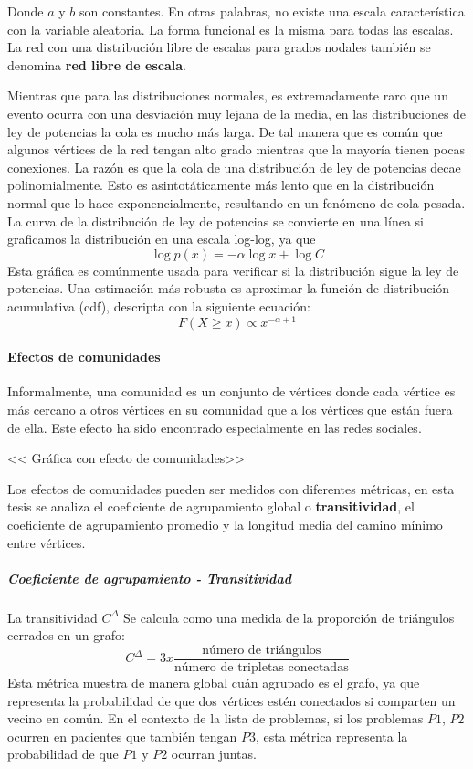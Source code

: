 Donde $a$ y $b$ son constantes. En otras palabras, no existe una escala característica con la variable aleatoria. La forma funcional es la misma para todas las escalas. La red con una distribución libre de escalas para grados nodales también se denomina \textbf{red libre de escala}.
 
Mientras que para las distribuciones normales, es extremadamente raro que un evento ocurra con una desviación muy lejana de la media, en las distribuciones de ley de potencias la cola es mucho más larga. De tal manera que es común que algunos vértices de la red tengan alto grado mientras que la mayoría tienen pocas conexiones. La razón es que la cola de una distribución de ley de potencias decae polinomialmente. Esto es asintotáticamente más lento que en la distribución normal que lo hace exponencialmente, resultando en un fenómeno de cola pesada. La curva de la distribución de ley de potencias se convierte en una línea si graficamos la distribución en una escala log-log, ya que
\begin{equation}
\log p(x) =-\alpha \log x + \log C
\end{equation}
Esta gráfica es comúnmente usada para verificar si la distribución sigue la ley de potencias. Una estimación más robusta es aproximar la función de distribución acumulativa (cdf), descripta con la siguiente ecuación:
\begin{equation}
F(X\geq x) \propto  x^{-\alpha+1 }
\end{equation}

\paragraph{Efectos de comunidades}
Informalmente, una comunidad es un conjunto de vértices donde cada vértice es más cercano a otros vértices en su comunidad que a los vértices que están fuera de ella. Este efecto ha sido encontrado especialmente en las redes sociales.\cite{Tang2010}

<< Gráfica con efecto de comunidades>>

Los efectos de comunidades pueden ser medidos con diferentes métricas, en esta tesis se analiza el coeficiente de agrupamiento global o \textbf{transitividad}, el coeficiente de agrupamiento promedio y la longitud media del camino mínimo entre vértices. 

\subparagraph{Coeficiente de agrupamiento - Transitividad}
La transitividad \cite{Wasserman1994} $C^{\Delta}$ Se calcula como una medida de la proporción de triángulos cerrados en un grafo:
\begin{equation}
C^{\Delta} =3x\frac{\text{número de triángulos}}{\text{número de tripletas conectadas}}
\end{equation}
Esta métrica muestra de manera global cuán agrupado es el grafo, ya que representa la probabilidad de que dos vértices estén conectados si comparten un vecino en común. En el contexto de la lista de problemas, si los problemas $P1$, $P2$ ocurren en pacientes que también tengan $P3$, esta métrica representa la probabilidad de que $P1$ y $P2$ ocurran juntas.


